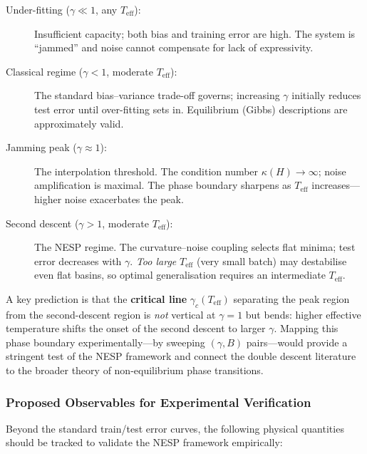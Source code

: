 \documentclass[
  journal=largetwo,
  year=2025,
  volume=37,
]{cup-journal}
\begin{document}
\begin{description}
    \item[Under-fitting ($\gamma \ll 1$, any $T_{\mathrm{eff}}$):] Insufficient capacity; both bias and training error are high. The system is ``jammed'' and noise cannot compensate for lack of expressivity.
    
    \item[Classical regime ($\gamma < 1$, moderate $T_{\mathrm{eff}}$):] The standard bias--variance trade-off governs; increasing $\gamma$ initially reduces test error until over-fitting sets in. Equilibrium (Gibbs) descriptions are approximately valid.
    
    \item[Jamming peak ($\gamma \approx 1$):] The interpolation threshold. The condition number $\kappa(H) \to \infty$; noise amplification is maximal. The phase boundary sharpens as $T_{\mathrm{eff}}$ increases---higher noise exacerbates the peak.
    
    \item[Second descent ($\gamma > 1$, moderate $T_{\mathrm{eff}}$):] The NESP regime. The curvature--noise coupling selects flat minima; test error decreases with $\gamma$. \emph{Too large} $T_{\mathrm{eff}}$ (very small batch) may destabilise even flat basins, so optimal generalisation requires an intermediate $T_{\mathrm{eff}}$.
\end{description}

\noindent A key prediction is that the \textbf{critical line} $\gamma_c(T_{\mathrm{eff}})$ separating the peak region from the second-descent region is \emph{not} vertical at $\gamma = 1$ but bends: higher effective temperature shifts the onset of the second descent to larger $\gamma$. Mapping this phase boundary experimentally---by sweeping $(\gamma, B)$ pairs---would provide a stringent test of the NESP framework and connect the double descent literature to the broader theory of non-equilibrium phase transitions.

\subsubsection{Proposed Observables for Experimental Verification}

Beyond the standard train/test error curves, the following physical quantities should be tracked to validate the NESP framework empirically:
\end{document}
